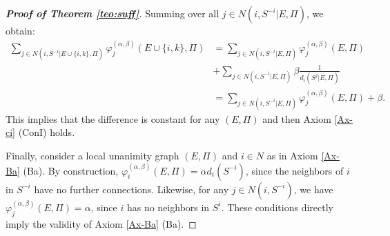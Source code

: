\documentclass[preprint,11pt,authoryear]{elsarticle}
\theoremstyle{plain}
\begin{document}
\begin{proof}[\bf Proof of Theorem \ref{teo:suff}]
	
	
	
	Summing over all $j \in N(i, S^{-i}|E, \Pi)$, we obtain:
	\begin{align*}
		\sum_{j \in N(i, S^{-i}|E \cup \{i,k\}, \Pi)} \varphi_j^{(\alpha,\beta)}(E \cup \{i,k\}, \Pi) &= \sum_{j \in N(i, S^{-i}|E, \Pi)} \varphi_j^{(\alpha,\beta)}(E, \Pi) \\
		& + \sum_{j \in N(i, S^{-i}|E, \Pi)} \beta \frac{1}{d_i (S^j|E, \Pi)} \\
		&= \sum_{j \in N(i, S^{-i}|E, \Pi)} \varphi_j^{(\alpha,\beta)}(E, \Pi) + \beta.
	\end{align*}
	This implies that the difference is   constant for any $(E,\Pi)$ and then Axiom \ref{Ax-ci} (ConI) holds.
	
	Finally, consider a local unanimity graph $(E, \Pi)$ and $i\in N$ as in Axiom \ref{Ax-Ba} (Ba). By construction, $\varphi_i^{(\alpha,\beta)}(E, \Pi) = \alpha 
	d_i (S^{-i})$, since the neighbors of $i$ in $S^{-i}$ have no further connections. Likewise, for any $j \in N(i, S^{-i})$, we have $\varphi_j^{(\alpha,\beta)}(E,\Pi) = \alpha$, since $i$ has no neighbors in $S^i$. These conditions directly imply the validity of Axiom \ref{Ax-Ba} (Ba).
\end{proof}
\end{document}
